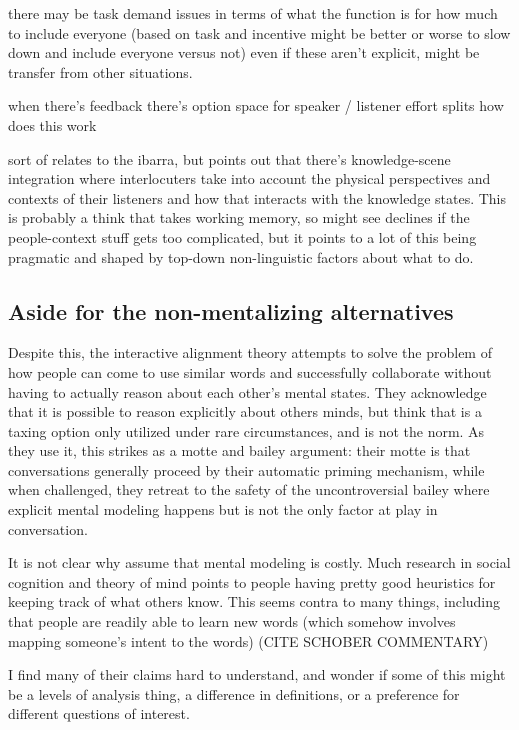 \documentclass[]{article}
\begin{document}
\cite{yoon2019} there may be task demand issues in terms of what the function is for how much to include everyone (based on task and incentive might be better or worse to slow down and include everyone versus not) even if these aren't explicit, might be transfer from other situations. 

\cite{yoon2019} when there's feedback there's option space for speaker / listener effort splits how does this work 

sort of relates to the ibarra, but \cite{yoon2019a} points out that there's knowledge-scene integration where interlocuters take into account the physical perspectives and contexts of their listeners and how that interacts with the knowledge states. This is probably a think that takes working memory, so might see declines if the people-context stuff gets too complicated, but it points to a lot of this being pragmatic and shaped by top-down non-linguistic factors about what to do. 

\subsection{Aside for the non-mentalizing alternatives} 
Despite this, the interactive alignment theory attempts to solve the problem of how people can come to use similar words and successfully collaborate without having to actually reason about each other's mental states. They acknowledge that it is possible to reason explicitly about others minds, but think that is a taxing option only utilized under rare circumstances, and is not the norm. As they use it, this strikes as a motte and bailey argument: their motte is that conversations generally proceed by their automatic priming mechanism, while when challenged, they retreat to the safety of the uncontroversial bailey where explicit mental modeling happens but is not the only factor at play in conversation.  

It is not clear why \cite{pickering2004} assume that mental modeling is costly. Much research in social cognition and theory of mind points to people having pretty good heuristics for keeping track of what others know. This seems contra to many things, including that people are readily able to learn new words (which somehow involves mapping someone's intent to the words) (CITE SCHOBER COMMENTARY)

I find many of their claims hard to understand, and wonder if some of this might be a levels of analysis thing, a difference in definitions, or a preference for different questions of interest. 
\end{document}
